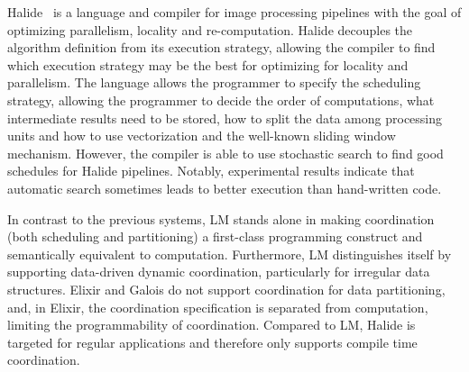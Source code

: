 Halide~\cite{Ragan-Kelley:2013:HLC:2491956.2462176} is a language and compiler
for image processing pipelines with the goal of optimizing parallelism, locality
and re-computation. Halide decouples the algorithm definition from its execution
strategy, allowing the compiler to find which execution strategy may be the best
for optimizing for locality and parallelism. The language allows the programmer
to specify the scheduling strategy, allowing the programmer to decide the order
of computations, what intermediate results need to be stored, how to split the
data among processing units and how to use vectorization and the well-known
sliding window mechanism. However, the compiler is able to use stochastic search
to find good schedules for Halide pipelines. Notably, experimental results
indicate that automatic search sometimes leads to better execution than
hand-written code.

In contrast to the previous systems, LM stands alone in making coordination
(both scheduling and partitioning) a first-class programming construct and
semantically equivalent to computation. Furthermore, LM distinguishes itself by
supporting data-driven dynamic coordination, particularly for irregular data
structures. Elixir and Galois do not support coordination for data partitioning,
and, in Elixir, the coordination specification is separated from computation,
limiting the programmability of coordination. Compared to LM, Halide is
targeted for regular applications and therefore only supports compile time
coordination.
